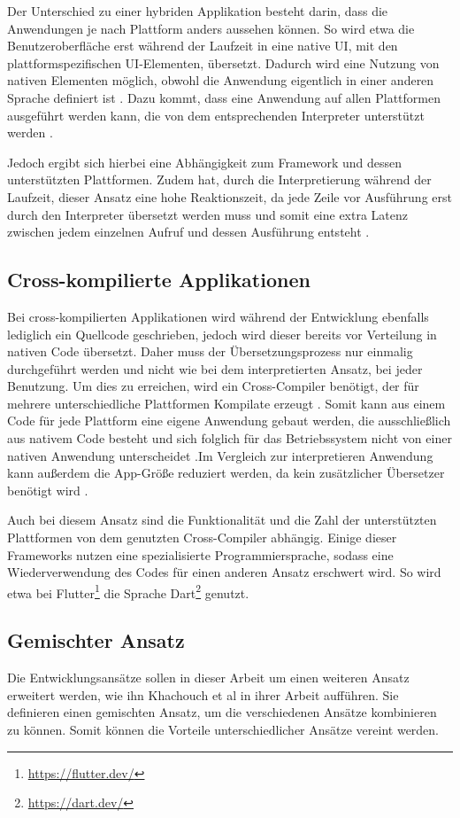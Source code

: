Der Unterschied zu einer hybriden Applikation besteht darin, dass die Anwendungen je nach Plattform anders aussehen können. So wird etwa die Benutzeroberfläche erst während der Laufzeit in eine native UI, mit den plattformspezifischen UI-Elementen, übersetzt.
Dadurch wird eine Nutzung von nativen Elementen möglich, obwohl die Anwendung eigentlich in einer anderen Sprache definiert ist \cite{IEEE_development_classes}. 
Dazu kommt, dass eine Anwendung auf allen Plattformen ausgeführt werden kann, die von dem entsprechenden Interpreter unterstützt werden \cite{server_side}.

Jedoch ergibt sich hierbei eine Abhängigkeit zum Framework und dessen unterstützten Plattformen. Zudem hat, durch die Interpretierung während der Laufzeit, dieser Ansatz eine hohe Reaktionszeit, da jede Zeile vor Ausführung erst durch den Interpreter übersetzt werden muss und somit eine extra Latenz zwischen jedem einzelnen Aufruf und dessen Ausführung entsteht \cite{server_side}.

\subsection{Cross-kompilierte Applikationen}
Bei cross-kompilierten Applikationen wird während der Entwicklung ebenfalls lediglich ein Quellcode geschrieben, jedoch wird dieser bereits vor Verteilung in nativen Code übersetzt. Daher muss der Übersetzungsprozess nur einmalig durchgeführt werden und nicht wie bei dem interpretierten Ansatz, bei jeder Benutzung. Um dies zu erreichen, wird ein Cross-Compiler benötigt, der für mehrere unterschiedliche Plattformen Kompilate erzeugt \cite{mobiledraft_cross_plattform}. Somit kann aus einem Code für jede Plattform eine eigene Anwendung gebaut werden, die ausschließlich aus nativem Code besteht und sich folglich für das Betriebssystem nicht von einer nativen Anwendung unterscheidet \cite{IEEE_development_classes}.Im Vergleich zur interpretieren Anwendung kann außerdem die App-Größe reduziert werden, da kein zusätzlicher Übersetzer benötigt wird \cite{mobiledraft_cross_plattform}.

Auch bei diesem Ansatz sind die Funktionalität und die Zahl der unterstützten Plattformen von dem genutzten Cross-Compiler abhängig. Einige dieser Frameworks nutzen eine spezialisierte Programmiersprache, sodass eine Wiederverwendung des Codes für einen anderen Ansatz erschwert wird. So wird etwa bei Flutter\footnote{\url{https://flutter.dev/}} die Sprache Dart\footnote{\url{https://dart.dev/}} genutzt.

\subsection{Gemischter Ansatz}
Die Entwicklungsansätze sollen in dieser Arbeit um einen weiteren Ansatz erweitert werden, wie ihn Khachouch et al \cite{IEEE_Khackouch_Al} in ihrer Arbeit aufführen. Sie definieren einen gemischten Ansatz, um die verschiedenen Ansätze kombinieren zu können. Somit können die Vorteile unterschiedlicher Ansätze vereint werden.
